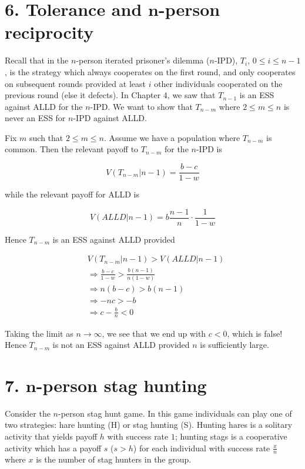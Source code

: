 \documentclass{article}
\begin{document}
\section*{6. Tolerance and $\boldsymbol{n}$-person reciprocity}

Recall that in the $n$-person iterated prisoner's dilemma ($n$-IPD),
$T_i$, $0 \leq i \leq n - 1$, is the strategy which always cooperates on
the first round, and only cooperates on subsequent rounds provided at
least $i$ other individuals cooperated on the previous round (else it
defects). In Chapter 4, we saw that $T_{n - 1}$ is an ESS against ALLD
for the $n$-IPD. We want to show that $T_{n - m}$ where $2 \leq m \leq
n$ is never an ESS for $n$-IPD against ALLD.

Fix $m$ such that $2 \leq m \leq n$. Assume we have a population where
$T_{n - m}$ is common. Then the relevant payoff to $T_{n - m}$ for the
$n$-IPD is

\begin{equation*}
    V(T_{n - m}|n - 1) = \frac{b - c}{1 - w}
\end{equation*}

while the relevant payoff for ALLD is

\begin{equation*}
    V(ALLD|n - 1) = b \frac{n - 1}{n} \cdot \frac{1}{1 - w}
\end{equation*}

Hence $T_{n - m}$ is an ESS against ALLD provided

\begin{align*}
    &V(T_{n - m}|n - 1) > V(ALLD|n - 1) \\
    &\Rightarrow \frac{b - c}{1 - w} > \frac{b (n - 1)}{n (1 - w)} \\
    &\Rightarrow n (b - c) > b (n - 1) \\
    &\Rightarrow - n c > - b \\
    &\Rightarrow c - \frac{b}{n} < 0
\end{align*}

Taking the limit as $n \to \infty$, we see that we end up with $c < 0$,
which is false! Hence $T_{n - m}$ is not an ESS against ALLD provided
$n$ is sufficiently large.

\section*{7. $\boldsymbol{n}$-person stag hunting}

Consider the $n$-person stag hunt game. In this game individuals can
play one of two strategies: hare hunting (H) or stag hunting (S).
Hunting hares is a solitary activity that yields payoff $h$ with success
rate $1$; hunting stags is a cooperative activity which has a payoff $s$
($s > h$) for each individual with success rate $\frac{x}{n}$ where $x$
is the number of stag hunters in the group.
\end{document}
